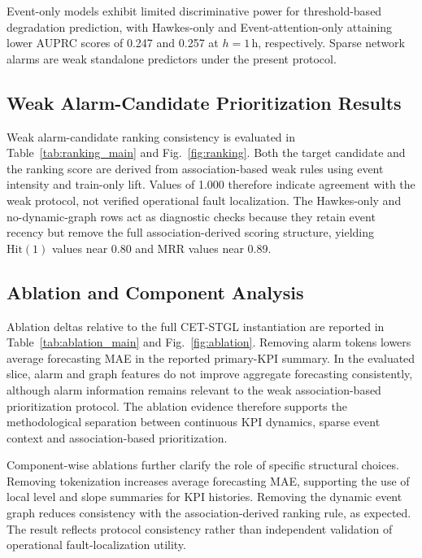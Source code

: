 Event-only models exhibit limited discriminative power for threshold-based degradation prediction, with Hawkes-only and Event-attention-only attaining lower AUPRC scores of 0.247 and 0.257 at $h=1$\,h, respectively. Sparse network alarms are weak standalone predictors under the present protocol.



\subsection{Weak Alarm-Candidate Prioritization Results}
\label{sec:ranking_results}

Weak alarm-candidate ranking consistency is evaluated in Table~\ref{tab:ranking_main} and Fig.~\ref{fig:ranking}. Both the target candidate and the ranking score are derived from association-based weak rules using event intensity and train-only lift. Values of 1.000 therefore indicate agreement with the weak protocol, not verified operational fault localization. The Hawkes-only and no-dynamic-graph rows act as diagnostic checks because they retain event recency but remove the full association-derived scoring structure, yielding $\mathrm{Hit}(1)$ values near 0.80 and MRR values near 0.89.



\subsection{Ablation and Component Analysis}
\label{sec:ablation_results}

Ablation deltas relative to the full CET-STGL instantiation are reported in Table~\ref{tab:ablation_main} and Fig.~\ref{fig:ablation}. Removing alarm tokens lowers average forecasting MAE in the reported primary-KPI summary. In the evaluated slice, alarm and graph features do not improve aggregate forecasting consistently, although alarm information remains relevant to the weak association-based prioritization protocol. The ablation evidence therefore supports the methodological separation between continuous KPI dynamics, sparse event context and association-based prioritization.

Component-wise ablations further clarify the role of specific structural choices. Removing tokenization increases average forecasting MAE, supporting the use of local level and slope summaries for KPI histories. Removing the dynamic event graph reduces consistency with the association-derived ranking rule, as expected. The result reflects protocol consistency rather than independent validation of operational fault-localization utility.

